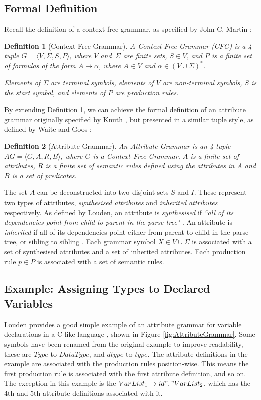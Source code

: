 \documentclass{UoYCSproject}
\newtheorem{definition}{Definition}[section]
\begin{document}
\subsection{Formal Definition}
\label{sec:FormalDefinition}
Recall the definition of a context-free grammar, as specified by John C. Martin
\cite{Martin}:
\begin{definition}[Context-Free Grammar] \label{def:CFG}
    A Context Free Grammar (CFG) is a 4-tuple $G = \langle V, \Sigma, S, 
    P\rangle$, where $V$ and $\,\Sigma$ are finite sets, $S \in V$, and $P$ is a
    finite set of formulas of the form $A \rightarrow \alpha$, where $A \in V$
    and $\alpha \in (V \cup \Sigma)^\ast$.

    Elements of $\Sigma$ are terminal symbols, elements of $V$ are non-terminal
    symbols, $S$ is the start symbol, and elements of $P$ are production rules.
\end{definition}
By extending Definition \ref{def:CFG}, we can achieve the formal definition of 
an attribute grammar originally specified by Knuth \cite{KnuthGrammars}, but 
presented in a similar tuple style, as defined by Waite and Goos 
\cite{WaiteBook}:
\begin{definition}[Attribute Grammar] \label{def:AG}
    An Attribute Grammar is an 4-tuple $AG = \langle G, A, R, B\rangle$, where
    $G$ is a Context-Free Grammar, $A$ is a finite set of attributes, $R$ 
    is a finite set of semantic rules defined using the attributes in $A$ and
    $B$ is a set of predicates.
\end{definition}
The set $A$ can be deconstructed into two disjoint sets $S$ and $I$. These
represent two types of attributes, \textit{synthesised attributes} and 
\textit{inherited attributes} respectively. As defined by Louden, an attribute
is \textit{synthesised} if \textit{``all of its dependencies point from child 
    to parent in the parse tree"} \cite[\S6.2.2, p.~277]{Louden}. An attribute
is \textit{inherited} if all of its dependencies point either from 
parent to child in the parse tree, or sibling to sibling 
\cite[\S6.2.2, p.~278]{Louden}. Each grammar symbol $X \in V \cup \Sigma$ is 
associated with a set of synthesised attributes and a set of inherited 
attributes. Each production rule $p \in P$ is associated with a set of 
semantic rules.

\subsection{Example: Assigning Types to Declared Variables}
Louden provides a good simple example of an attribute grammar for variable
declarations in a C-like language \cite[p.~266]{Louden}, shown in Figure 
\ref{fig:AttributeGrammar}. Some symbols have been renamed from the original
example to improve readability, these are $Type$ to $DataType$, and $dtype$ to
$type$. The attribute definitions in the example are associated with the
production rules position-wise. This means the first production rule is 
associated with the first attribute definition, and so on. The exception in this
example is the $VarList_1 \rightarrow id "," VarList_2$, which has the 4th and
5th attribute definitions associated with it.
\end{document}
